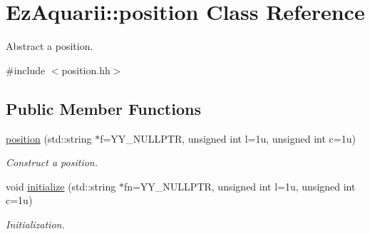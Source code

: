 \hypertarget{classEzAquarii_1_1position}{}\section{Ez\+Aquarii\+:\+:position Class Reference}
\label{classEzAquarii_1_1position}


Abstract a position.  




{\ttfamily \#include $<$position.\+hh$>$}

\subsection*{Public Member Functions}
\begin{DoxyCompactItemize}
\item 
\hyperlink{classEzAquarii_1_1position_a2b6a13e88b107582f7dac40651afa659}{position} (std\+::string $\ast$f=Y\+Y\+\_\+\+N\+U\+L\+L\+P\+TR, unsigned int l=1u, unsigned int c=1u)\hypertarget{classEzAquarii_1_1position_a2b6a13e88b107582f7dac40651afa659}{}\label{classEzAquarii_1_1position_a2b6a13e88b107582f7dac40651afa659}

\begin{DoxyCompactList}\small\item\em Construct a position. \end{DoxyCompactList}\item 
void \hyperlink{classEzAquarii_1_1position_a68c0020162c965978bec822533af6dff}{initialize} (std\+::string $\ast$fn=Y\+Y\+\_\+\+N\+U\+L\+L\+P\+TR, unsigned int l=1u, unsigned int c=1u)\hypertarget{classEzAquarii_1_1position_a68c0020162c965978bec822533af6dff}{}\label{classEzAquarii_1_1position_a68c0020162c965978bec822533af6dff}

\begin{DoxyCompactList}\small\item\em Initialization. \end{DoxyCompactList}\end{DoxyCompactItemize}
